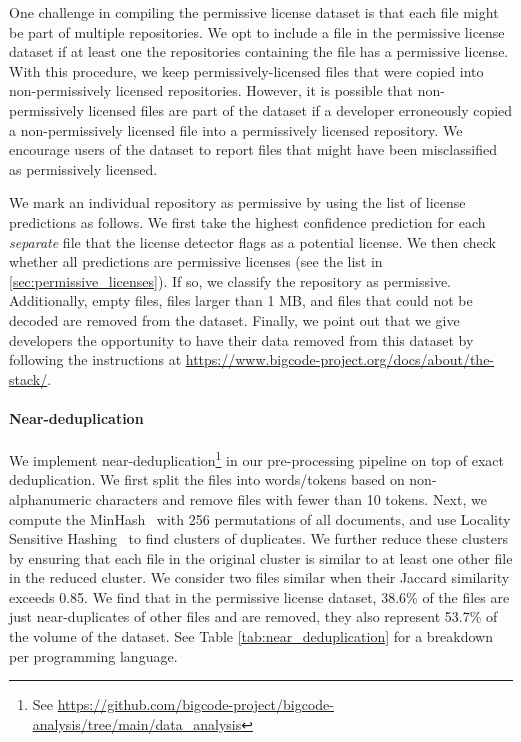 One challenge in compiling the permissive license dataset is that each file might be part of multiple repositories. We opt to include a file in the permissive license dataset if at least one the repositories containing the file has a permissive license. With this procedure, we keep permissively-licensed files that were copied into non-permissively licensed repositories. However, it is possible that non-permissively licensed files are part of the dataset if a developer erroneously copied a non-permissively licensed file into a permissively licensed repository. We encourage users of the dataset to report files that might have been misclassified as permissively licensed.  

We mark an individual repository as permissive by using the list of license predictions as follows. We first take the highest confidence prediction for each \emph{separate} file that the license detector flags as a potential license. We then check whether all predictions are permissive licenses (see the list in \ref{sec:permissive_licenses}). If so, we classify the repository as permissive. Additionally, empty files, files larger than 1 MB, and files that could not be decoded are removed from the dataset. Finally, we point out that we give developers the opportunity to have their data removed from this dataset by following the instructions at \url{https://www.bigcode-project.org/docs/about/the-stack/}. 

\paragraph{Near-deduplication} We implement near-deduplication\footnote{See  \url{https://github.com/bigcode-project/bigcode-analysis/tree/main/data_analysis}} in our pre-processing pipeline on top of exact deduplication. We first split the files into words/tokens based on non-alphanumeric characters and remove files with fewer than 10 tokens. Next, we compute the MinHash~\citep{broder2000identifying,lee2021deduplicating} with 256 permutations of all documents, and use Locality Sensitive Hashing~\citep{har2012approximate} to find clusters of duplicates. We further reduce these clusters by ensuring that each file in the original cluster is similar to at least one other file in the reduced cluster. We consider two files similar when their Jaccard similarity exceeds 0.85. We find that in the permissive license dataset,  38.6\% of the files are just near-duplicates of other files and are removed, they also represent 53.7\% of the volume of the dataset. See Table \ref{tab:near_deduplication} for a breakdown per programming language.

